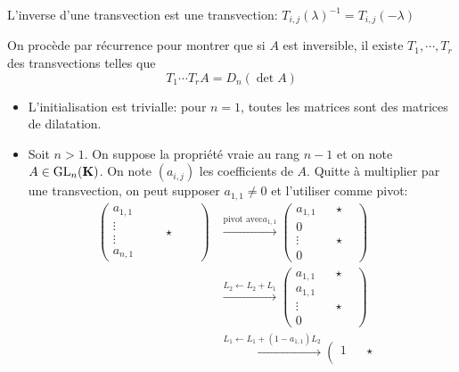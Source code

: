 \begin{rem}
    L'inverse d'une transvection est une transvection: $T_{i,j}(\lambda)^{-1}=T_{i,j}(-\lambda)$
\end{rem}

On procède par récurrence pour montrer que si $A$ est inversible, il existe  $T_1, \cdots , T_r$ des transvections telles que \[
    T_1\cdots T_rA=D_n(\det A)
\] \begin{itemize}
    \item L'initialisation est trivialle: pour $n=1$, toutes les matrices sont des matrices de dilatation.
    \item Soit  $n> 1$. On suppose la propriété vraie au rang  $n-1$ et on note  $A \in  \mathrm{GL}_{n}(\mathbf K)$. On note $(a_{i,j})$ les coefficients de $A$. Quitte à multiplier par une transvection, on peut supposer  $a_{1,1}\neq 0$ et l'utiliser comme pivot: \begin{align*}
            \left( \begin{array}{c}
                    a_{1,1}  \\
                    \vdots \\
                    \vdots \\
                    a_{n,1}
            \end{array}
            \hspace{2em}\star\hspace{2em}
            \right) &\xrightarrow{\text{pivot avec} a_{1,1}} \left( \begin{array}{c|ccc}
                a_{1,1} & & \star &\\
            \hline 0 \\
            \vdots & &\star &\\
            0
        \end{array}
         \right) 
        \\
                    & \xrightarrow{L_2 \leftarrow L_2+L_1}\left( \begin{array}{c|ccc}
                a_{1,1} & & \star &\\
            \hline a_{1,1} \\
            \vdots & &\star &\\
            0
        \end{array}
         \right) 
        \\
                    & \xrightarrow{L_1 \leftarrow L_1+(1-a_{1,1})L_2}\left( \begin{array}{c|ccc}
                1 & & \star &\\

\end{array}
\end{align*}
\end{itemize}
